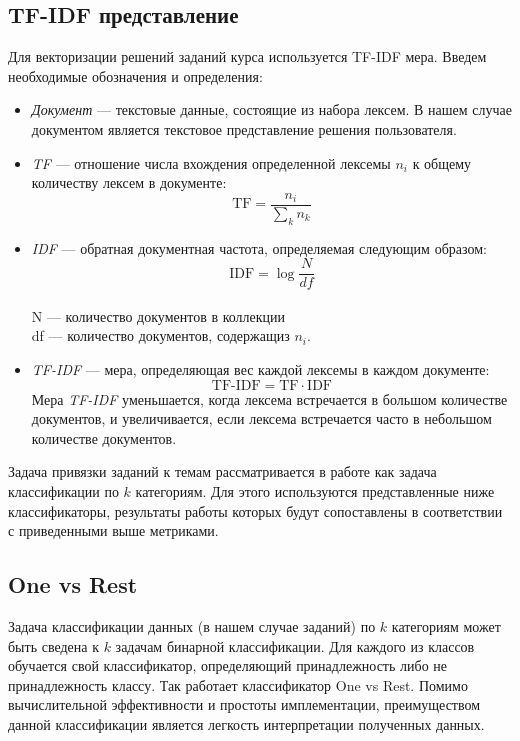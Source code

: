 \documentclass[14pt]{matmex-diploma-custom}
\begin{document}
\subsection*{TF-IDF представление}

Для векторизации решений заданий курса используется TF-IDF мера. Введем необходимые обозначения и определения:

\begin{itemize}
    \item \textit{Документ} --- текстовые данные, состоящие из набора лексем. В нашем случае документом является текстовое представление решения пользователя.
    \item \textit{TF } --- отношение числа вхождения определенной лексемы $n_{i}$ к общему количеству лексем в документе:
    \[
    \text{TF}=\frac{n_{i}}{\sum_{k}n_{k}}
    \]
    \item \textit{IDF } --- обратная документная частота, определяемая следующим образом: 
    \[
    \text{IDF}=\log\frac{N}{df}
    \]
    \\N --- количество документов в коллекции
    \\df --- количество документов, содержащиз $n_{i}$.
    \item \textit{TF-IDF} --- мера, определяющая вес каждой лексемы в каждом документе:
    \[
    \text{TF-IDF}= \text{TF}\cdot\text{IDF}
    \]
    Мера \textit{TF-IDF} уменьшается, когда лексема встречается в большом количестве документов, и увеличивается, если лексема встречается часто в небольшом количестве документов.
\end{itemize}

Задача привязки заданий к темам рассматривается в работе как задача классификации по $k$ категориям. Для этого используются представленные ниже классификаторы, результаты работы которых будут сопоставлены в соответствии с приведенными выше метриками.

\subsection*{One vs Rest}

Задача классификации данных (в нашем случае заданий) по $k$ категориям может быть сведена к $k$ задачам бинарной классификации. Для каждого из классов обучается свой классификатор, определяющий принадлежность либо не принадлежность классу. Так работает классификатор One vs Rest. Помимо вычислительной эффективности и простоты имплементации, преимуществом данной классификации является легкость интерпретации полученных данных.
\end{document}
